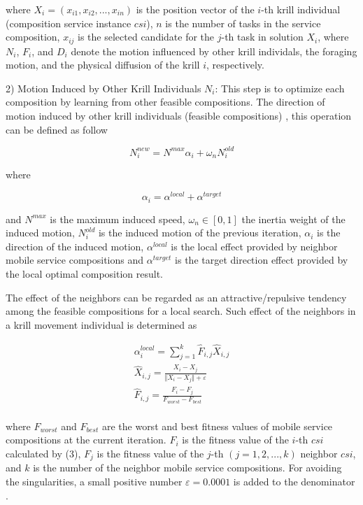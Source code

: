 where $X_i = (x_{i1}, x_{i2}, . . . , x_{in})$ is the position vector of the $i$-th krill individual (composition service instance $csi$), $n$ is the number of tasks in the service composition, $x_{ij}$ is the selected candidate for the $j$-th task in solution $X_i$, where $N_i$, $F_i$, and $D_i$ denote the motion influenced by other krill individals, the foraging motion, and the physical diffusion of the krill $i$, respectively.

2) Motion Induced by Other Krill Individuals $N_i$: This step is to optimize each composition by learning from other feasible compositions. The direction of motion induced by other krill individuals (feasible compositions) , this operation can be defined as follow

\begin{equation}
N^{new}_i = N^{max}\alpha_i + \omega_n N^{old}_i
\end{equation}

where

\begin{equation}
\alpha_i = \alpha^{local}+\alpha^{target}
\end{equation}

and $N^{max}$ is the maximum induced speed, $\omega_n \in [0, 1]$ the inertia weight of the induced motion, $N^{old}_{i}$ is the induced motion of the previous iteration, $\alpha_i$ is the direction of the induced motion, $\alpha^{local}$ is the local effect provided by neighbor mobile service compositions and $\alpha^{target}$ is the target direction effect provided by the local optimal composition result.

The effect of the neighbors can be regarded as an attractive/repulsive tendency among the feasible compositions for a local search. Such effect of the neighbors in a krill movement individual is determined as

\begin{eqnarray}
\alpha_i^{local} = \sum_{j=1}^{k}\hat{F}_{i,j}\hat{X}_{i,j}\\
\hat{X}_{i,j} = \frac{X_i-X_j}{\Vert X_i-X_j \Vert + \varepsilon}\\
\hat{F}_{i,j} = \frac{F_i-F_j}{F_{worst}-F_{best}}\\
\end{eqnarray}

where $F_{worst}$ and $F_{best}$ are the worst and best fitness values of mobile service compositions at the current iteration. $F_i$ is the fitness value of the $i$-th $csi$ calculated by (3), $F_j$ is the fitness value of the $j$-th $(j = 1,2,...,k)$ neighbor $csi$, and $k$ is the number of the neighbor mobile service compositions. For avoiding the singularities, a small positive number $\varepsilon = 0.0001$ is added to the denominator \cite{gandomi2012krill}.


